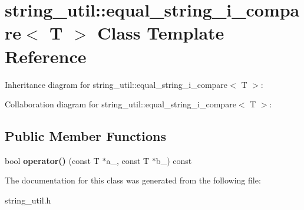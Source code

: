 \section{string\+\_\+util\+:\+:equal\+\_\+string\+\_\+i\+\_\+compare$<$ T $>$ Class Template Reference}
\label{classstring__util_1_1equal__string__i__compare}


Inheritance diagram for string\+\_\+util\+:\+:equal\+\_\+string\+\_\+i\+\_\+compare$<$ T $>$\+:


Collaboration diagram for string\+\_\+util\+:\+:equal\+\_\+string\+\_\+i\+\_\+compare$<$ T $>$\+:
\subsection*{Public Member Functions}
\begin{DoxyCompactItemize}
\item 
bool {\bfseries operator()} (const T $\ast$a\+\_\+, const T $\ast$b\+\_\+) const \label{classstring__util_1_1equal__string__i__compare_af8c94159bbb8903c7cf7b71941a7d2bc}

\end{DoxyCompactItemize}


The documentation for this class was generated from the following file\+:\begin{DoxyCompactItemize}
\item 
string\+\_\+util.\+h\end{DoxyCompactItemize}
